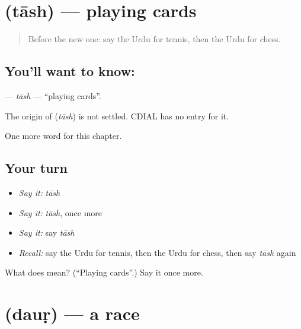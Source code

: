 \section[\texorpdfstring{\ur{تاش} (tāsh)}{تاش (tāsh)}]{ (tāsh) — playing cards}

\label{lesson:UR-C201-tash}



\begin{quote}
Before the new one: say the Urdu for tennis, then the Urdu for chess.
\end{quote}

\subsection*{You'll want to know: }
\textbf{} — \emph{tāsh} — \textquotedblleft{}playing cards\textquotedblright{}.

\begin{cousinweb}
The origin of \textbf{} (\emph{tāsh}) is not settled. CDIAL has no entry for it.
\end{cousinweb}

\begin{grammarlens}[title={What you've built}]
One more word for this chapter.
\end{grammarlens}

\subsection*{Your turn}
\begin{itemize}
\raggedright
  \item \emph{Say it:} \emph{tāsh}
  \item \emph{Say it:} \emph{tāsh}, once more
  \item \emph{Say it:} say \emph{tāsh}
  \item \emph{Recall:} say the Urdu for tennis, then the Urdu for chess, then say \emph{tāsh} again
\end{itemize}

\begin{tcolorbox}[breakable,colback=teal!4,colframe=teal!35!black,title={Before you move on}]
What does  mean? (\textquotedblleft{}Playing cards\textquotedblright{}.) Say it once more.
\end{tcolorbox}
\section[\texorpdfstring{\ur{دوڑ} (dauṛ)}{دوڑ (dauṛ)}]{ (dauṛ) — a race}

